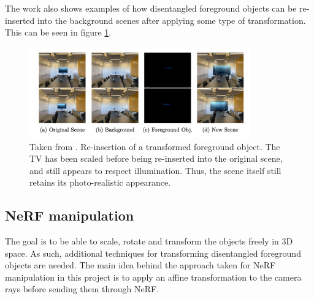 The work also shows examples of how disentangled foreground objects can be re-inserted into the background scenes after applying some type of transformation. This can be seen in figure \ref{fig:tv-example}.
\begin{figure}[H]
    \centering
    \includegraphics[width=0.85\textwidth]{figures/tv-example.png}
    \caption{Taken from \cite{benaim2022}. Re-insertion of a transformed foreground object. The TV has been scaled before being re-inserted into the original scene, and still appears to respect illumination. Thus, the scene itself still retains its photo-realistic appearance.}
    \label{fig:tv-example}
\end{figure}


\subsection{NeRF manipulation}
\label{sec:nerf-manipulation}
The goal is to be able to scale, rotate and transform the objects freely in 3D space. As such, additional techniques for transforming disentangled foreground objects are needed. The main idea behind the approach taken for NeRF manipulation in this project is to apply an affine transformation to the camera rays before sending them through NeRF.

